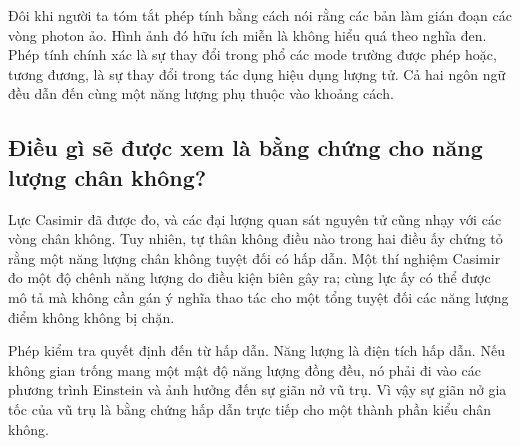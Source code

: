\begin{classroomqa}
\end{classroomqa}

Đôi khi người ta tóm tắt phép tính bằng cách nói rằng các bản làm gián đoạn các vòng photon ảo. Hình ảnh đó hữu ích miễn là không hiểu quá theo nghĩa đen. Phép tính chính xác là sự thay đổi trong phổ các mode trường được phép hoặc, tương đương, là sự thay đổi trong tác dụng hiệu dụng lượng tử. Cả hai ngôn ngữ đều dẫn đến cùng một năng lượng phụ thuộc vào khoảng cách.

\begin{classroomqa}
\end{classroomqa}

\subsection{Điều gì sẽ được xem là bằng chứng cho năng lượng chân không?}

Lực Casimir đã được đo, và các đại lượng quan sát nguyên tử cũng nhạy với các vòng chân không. Tuy nhiên, tự thân không điều nào trong hai điều ấy chứng tỏ rằng một năng lượng chân không tuyệt đối có hấp dẫn. Một thí nghiệm Casimir đo một độ chênh năng lượng do điều kiện biên gây ra; cùng lực ấy có thể được mô tả mà không cần gán ý nghĩa thao tác cho một tổng tuyệt đối các năng lượng điểm không không bị chặn.

Phép kiểm tra quyết định đến từ hấp dẫn. Năng lượng là điện tích hấp dẫn. Nếu không gian trống mang một mật độ năng lượng đồng đều, nó phải đi vào các phương trình Einstein và ảnh hưởng đến sự giãn nở vũ trụ. Vì vậy sự giãn nở gia tốc của vũ trụ là bằng chứng hấp dẫn trực tiếp cho một thành phần kiểu chân không.

